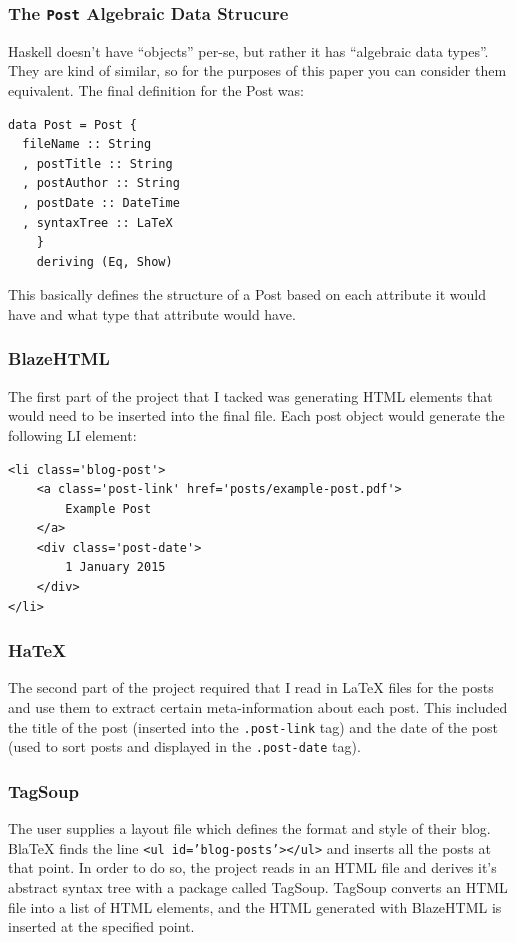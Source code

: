 \documentclass[doc,apacite,12pt]{apa6}
\begin{document}
  \subsubsection{The \texttt{Post} Algebraic Data Strucure}

    Haskell doesn't have ``objects'' per-se, but rather it has ``algebraic data types''. They are kind of similar, so for the purposes of this paper you can consider them equivalent. The final definition for the Post was:

    \begin{verbatim}
data Post = Post {
  fileName :: String
  , postTitle :: String
  , postAuthor :: String
  , postDate :: DateTime
  , syntaxTree :: LaTeX
    }
    deriving (Eq, Show)
    \end{verbatim}

  This basically defines the structure of a Post based on each attribute it would have and what type that attribute would have. 

  \subsubsection{BlazeHTML}
    The first part of the project that I tacked was generating HTML elements that would need to be inserted into the final file. Each post object would generate the following LI element:

  \begin{verbatim}
<li class='blog-post'>
    <a class='post-link' href='posts/example-post.pdf'>
        Example Post
    </a>
    <div class='post-date'>
        1 January 2015
    </div>
</li>
  \end{verbatim}

  \subsubsection{HaTeX}
    The second part of the project required that I read in LaTeX files for the posts and use them to extract certain meta-information about each post. This included the title of the post (inserted into the \texttt{.post-link} tag) and the date of the post (used to sort posts and displayed in the \texttt{.post-date} tag). 

  \subsubsection{TagSoup}

    The user supplies a layout file which defines the format and style of their blog. BlaTeX finds the line \texttt{<ul id='blog-posts'></ul>} and inserts all the posts at that point. In order to do so, the project reads in an HTML file and derives it's abstract syntax tree with a package called TagSoup. TagSoup converts an HTML file into a list of HTML elements, and the HTML generated with BlazeHTML is inserted at the specified point. 
\end{document}
